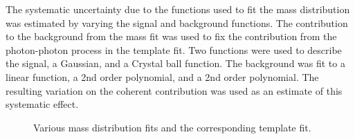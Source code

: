     The systematic uncertainty due to the \DIFdelbegin {}\DIFdelend functions used to fit
      the mass distribution was estimated by varying the signal and 
      background functions.
    The contribution to the background from the mass fit was used to fix the
      contribution from the photon-photon process in the \pt{} template
      fit.
    Two functions were used to describe the signal, a Gaussian, and a Crystal
      ball function. 
    The background was fit to a linear function, a 2nd order polynomial, and
      a 2nd order \DIFdelbegin {}\DIFdelend \DIFaddbegin {}\DIFaddend polynomial. 
    The resulting variation on the coherent contribution was used \DIFdelbegin {}\DIFdelend as an
      estimate of this systematic effect. 

    \begin{figure}[!Hhbt]
      \centering
      \DIFdelbeginFL {}\DIFdelendFL \DIFaddbeginFL {}\DIFaddendFL \caption{Various mass distribution fits and the corresponding \pt{}
        template fit.}
      \label{fig:massPtFitsForSyst}
    \end{figure}

